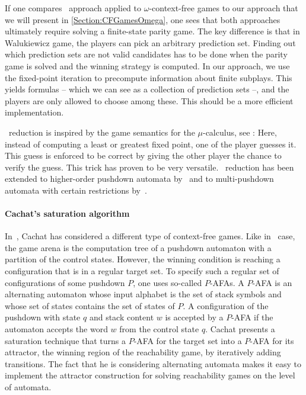 \documentclass[../../diss.tex]{subfiles}
\begin{document}
If one compares \Walus~approach applied to $\omega$-context-free games to our approach that we will present in \cref{Section:CFGamesOmega}, one sees that both approaches ultimately require solving a finite-state parity game.
The key difference is that in Walukiewicz game, the players can pick an arbitrary prediction set.
Finding out which prediction sets are not valid candidates has to be done when the parity game is solved and the winning strategy is computed.
In our approach, we use the fixed-point iteration to precompute information about finite subplays.
This yields formulas -- which we can see as a collection of prediction sets --, and the players are only allowed to choose among these.
This should be a more efficient implementation.

\Walus~reduction is inspired by the game semantics for the $\mu$-calculus, see \eg \cite{BradfieldW18}:
Here, instead of computing a least or greatest fixed point, one of the player guesses it.
This guess is enforced to be correct by giving the other player the chance to verify the guess.
This trick has proven to be very versatile.
\Walus~reduction has been extended to higher-order pushdown automata by~ and to multi-pushdown automata with certain restrictions by~.

\paragraph{Cachat's saturation algorithm}

In~\cite{Cachat02}, Cachat has considered a different type of context-free games.
Like in \Walus~case, the game arena is the computation tree of a pushdown automaton with a partition of the control states.
However, the winning condition is reaching a configuration that is in a regular target set.
To specify such a regular set of configurations of some pushdown $P$, one uses so-called $P$-AFAs.
A $P$-AFA is an alternating automaton whose input alphabet is the set of stack symbols and whose set of states contains the set of states of $P$.
A configuration of the pushdown with state $q$ and stack content $w$ is accepted by a $P$-AFA if the automaton accepts the word $w$ from the control state $q$.
Cachat presents a saturation technique that turns a $P$-AFA for the target set into a $P$-AFA for its attractor, the winning region of the reachability game, by iteratively adding transitions.
The fact that he is considering alternating automata makes it easy to implement the attractor construction for solving reachability games on the level of automata.
\end{document}
